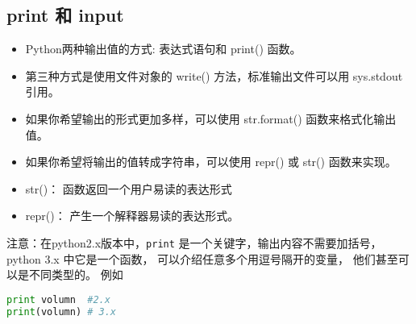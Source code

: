 
\begin{issues}
\issueTODO
\issueDraft
\end{issues}


\subsection{print 和 input}

\begin{itemize}
\item Python两种输出值的方式: 表达式语句和 print() 函数。
\item 第三种方式是使用文件对象的 write() 方法，标准输出文件可以用 sys.stdout 引用。
\item 如果你希望输出的形式更加多样，可以使用 str.format() 函数来格式化输出值。
\item 如果你希望将输出的值转成字符串，可以使用 repr() 或 str() 函数来实现。
\end{itemize}

\begin{itemize}
\item str()： 函数返回一个用户易读的表达形式
\item repr()： 产生一个解释器易读的表达形式。
\end{itemize}

注意：在python2.x版本中，\verb|print| 是一个关键字，输出内容不需要加括号， python 3.x 中它是一个函数， 可以介绍任意多个用逗号隔开的变量， 他们甚至可以是不同类型的。 例如
\begin{lstlisting}[language=python]
print volumn  #2.x
print(volumn) # 3.x
\end{lstlisting}
